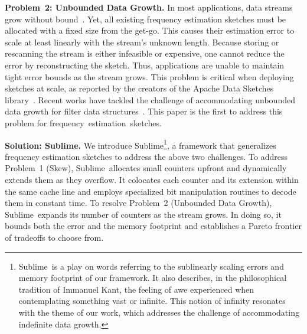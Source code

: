 \documentclass[sigconf]{acmart}
\newcommand{\sketch}{Sublime}
\begin{document}
\textbf{Problem~2: Unbounded Data Growth.}
In most applications, data streams grow without
bound~\cite{Compass,QueryOptimizationSketches,ConvolutionSketch,SketchBasedChangeDetection,WhatsNew,TrafficManagementSurvey}.
Yet, all existing frequency estimation sketches must be allocated with a fixed
size from the get-go. This causes their estimation error to scale at least
linearly with the stream's unknown length. Because storing or rescanning the
stream is either infeasible or expensive, one cannot reduce the error by
reconstructing the sketch. Thus, applications are unable to maintain tight
error bounds as the stream grows. This problem is critical when deploying
sketches at scale, as reported by the creators of the Apache Data Sketches
library~\cite{SimonsYahoo,DataSketches}. Recent works have tackled the
challenge of accommodating unbounded data growth for filter data
structures~\cite{PaghExpandability,TaffyFilters,InfiniFilter,AlephFilter,Memento,Diva,Aeris}.
This paper is the first to address this problem for
frequency~estimation~sketches.

\textbf{Solution: \sketch.}
We introduce \sketch\footnote{\sketch\ is a play on words referring to the
sublinearly scaling errors and memory footprint of our framework. It also
describes, in the philosophical tradition of Immanuel Kant, the feeling of awe
experienced when contemplating something vast or infinite. This notion of
infinity resonates with the theme of our work, which addresses the challenge of
accommodating indefinite data growth.}, a framework that generalizes frequency
estimation sketches to address the above two challenges. To address Problem~1
(Skew), \sketch\ allocates small counters upfront and dynamically extends them
as they overflow. It colocates each counter and its extension within the same
cache line and employs specialized bit manipulation routines to decode them in
constant time. To resolve Problem~2 (Unbounded Data Growth), \sketch\ expands
its number of counters as the stream grows. In doing so, it bounds both the
error and the memory footprint and establishes a Pareto frontier of tradeoffs
to choose from. 
\end{document}
